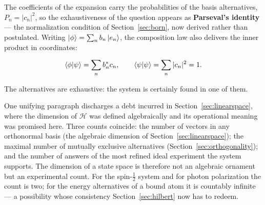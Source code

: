 The coefficients of the expansion carry the probabilities of the basis alternatives, $P_n=|c_n|^2$, so the exhaustiveness of the question appears as \textbf{Parseval's identity} --- the normalization condition of Section~\ref{sec:born}, now derived rather than postulated. Writing $\ket{\phi}=\sum_n b_n\ket{e_n}$, the composition law also delivers the inner product in coordinates:
\begin{linenomath}
    \begin{equation}
        \braket{\phi|\psi}=\sum_n b_n^{*}c_n,
        \qquad
        \braket{\psi|\psi}=\sum_n|c_n|^2=1.
        \label{eq:parseval}
    \end{equation}
\end{linenomath}
The alternatives are exhaustive: the system is certainly found in one of them.

One unifying paragraph discharges a debt incurred in Section~\ref{sec:linearspace}, where the dimension of $\mathcal{H}$ was defined algebraically and its operational meaning was promised here. Three counts coincide: the number of vectors in any orthonormal basis (the algebraic dimension of Section~\ref{sec:linearspace}); the maximal number of mutually exclusive alternatives (Section~\ref{sec:orthogonality}); and the number of answers of the most refined ideal experiment the system supports. The dimension of a state space is therefore not an algebraic ornament but an experimental count. For the spin-$\tfrac12$ system and for photon polarization the count is two; for the energy alternatives of a bound atom it is countably infinite --- a possibility whose consistency Section~\ref{sec:hilbert} now has to redeem.

